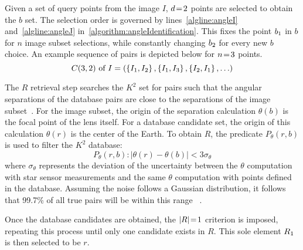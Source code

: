 Given a set of query points from the image $I$, $d \!=\! 2$ points are selected to obtain the $b$ set.
The selection order is governed by lines~\ref{algline:angleI} and~\ref{algline:angleJ}
in~\autoref{algorithm:angleIdentification}.
This fixes the point $b_1$ in $b$ for $n$ image subset selections, while constantly changing $b_2$ for every
new $b$ choice.
An example sequence of pairs is depicted below for $n \!=\! 3$ points.
\begin{equation}
    C(3, 2) \text{ of } I = \left(\left\{ I_1, I_2 \right\}, \left\{ I_1,I_3 \right\}, \left\{ I_2,I_1 \right\},
    \ldots \right)
\end{equation}

The $R$ retrieval step searches the $K^2$ set for pairs such that the angular separations of the database pairs
are close to the separations of the image subset~\cite{bratt:analysisStarIdentification}.
For the image subset, the origin of the separation calculation $\theta(b)$ is the focal point of the lens itself.
For a database candidate set, the origin of this calculation $\theta(r)$ is the center of the Earth.
To obtain $R$, the predicate $P_\theta(r, b)$ is used to filter the $K^2$ database:
\begin{equation}\label{eq:angleRequirement}
    P_{\theta}(r, b) : \left\lvert \theta(r) - \theta(b)\right\rvert < 3 \sigma_\theta
\end{equation}
where $\sigma_{\theta}$ represents the deviation of the uncertainty between the $\theta$ computation with star
sensor measurements and the same $\theta$ computation with points defined in the database.
Assuming the noise follows a Gaussian distribution, it follows that 99.7\% of all true pairs will be within this range
~\cite{coleAndCrassidis:sphericalTriangleMethod}.

Once the database candidates are obtained, the $\left| R \right| \!=\! 1$ criterion is imposed, repeating this process until only
one candidate exists in $R$.
This sole element $R_1$ is then selected to be $r$.

